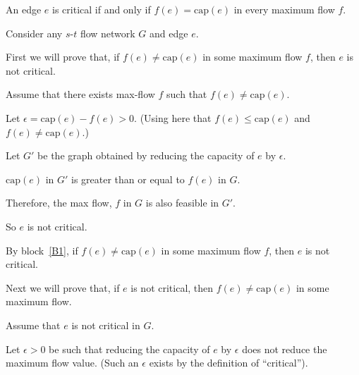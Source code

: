 \documentclass[10pt]{article}
\begin{document}
\begin{problems}

  \setcounter{lemma}{1}
  \begin{lemma}
    An edge $e$ is critical if and only if $f(e) = \text{cap}(e)$ in every maximum flow $f$.
  \end{lemma}

  \begin{longFormProof}

    \begin{block}[B]
      {Consider any $s$-$t$ flow network $G$ and edge $e$.

      \lineacross }
      
      \step First we will prove that, if $f(e) \ne \text{cap}(e)$ in some maximum flow $f$, then $e$ is not critical.

      \smallskip 
      
      \begin{block}[B1]
        {Assume that there exists max-flow $f$ such that $f(e) \ne \text{cap}(e)$.}

        \step Let $\epsilon = \text{cap}(e) - f(e) > 0$.  (Using here that $f(e) \le \text{cap}(e)$ and $f(e)\ne\text{cap}(e)$.)

        \step Let $G'$ be the graph obtained by reducing the capacity of $e$ by $\epsilon$.

        \step $\text{cap}(e)$ in $G'$ is greater than or equal to $f(e)$ in $G$.

        \step Therefore, the max flow, $f$ in $G$ is also feasible in $G'$.

        \step So $e$ is not critical.
      \end{block}

      \step[B2] By block~\ref{B1}, if $f(e) \ne \text{cap}(e)$ in some maximum flow $f$,
      then $e$ is not critical.

      \smallskip 

      \lineacross 

      \step Next we will prove that, if $e$ is not critical, then $f(e) \ne \text{cap}(e)$ in some maximum flow.

      \smallskip 

      \begin{block}[B3]
        {Assume that $e$ is not critical in $G$.}

        \step[S1] Let $\epsilon>0$ be such that reducing the capacity of $e$ by $\epsilon$ does not reduce the maximum flow value.  (Such an $\epsilon$ exists by the definition of ``critical'').


\end{block}
\end{block}
\end{longFormProof}
\end{problems}
\end{document}
